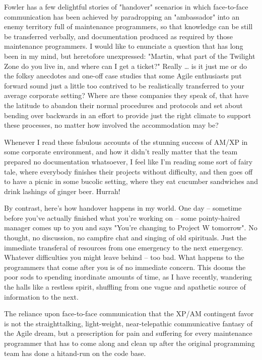 \documentclass{article}
\begin{document}
Fowler has a few delightful stories of "handover" scenarios in which
face-to-face communication has been achieved by paradropping an
"ambassador" into an enemy territory full of maintenance programmers, so
that knowledge can be still be transferred verbally, and documentation
produced as required by those maintenance programmers. I would like to
enunciate a question that has long been in my mind, but heretofore
unexpressed: "Martin, what part of the Twilight Zone do you live in, and
where can I get a ticket?" Really \ldots{} is it just me or do the folksy
anecdotes and one-off case studies that some Agile enthusiasts put
forward sound just a little too contrived to be realistically
transferred to your average corporate setting? Where are these companies
they speak of, that have the latitude to abandon their normal procedures
and protocols and set about bending over backwards in an effort to
provide just the right climate to support these processes, no matter how
involved the accommodation may be?

Whenever I read these fabulous accounts of the stunning success of AM/XP
in some corporate environment, and how it didn't really matter that the
team prepared no documentation whatsoever, I feel like I'm reading some
sort of fairy tale, where everybody finishes their projects without
difficulty, and then goes off to have a picnic in some bucolic setting,
where they eat cucumber sandwiches and drink lashings of ginger beer.
Hurrah!

By contrast, here's how handover happens in my world. One day --
sometime before you've actually finished what you're working on -- some
pointy-haired manager comes up to you and says "You're changing to
Project W tomorrow". No thought, no discussion, no campfire chat and
singing of old spirituals. Just the immediate transferal of resources
from one emergency to the next emergency. Whatever difficulties you
might leave behind -- too bad. What happens to the programmers that come
after you is of no immediate concern. This dooms the poor sods to
spending inordinate amounts of time, as I have recently, wandering the
halls like a restless spirit, shuffling from one vague and apathetic
source of information to the next.

The reliance upon face-to-face communication that the XP/AM contingent
favor is not the straighttalking, light-weight, near-telepathic
communicative fantasy of the Agile dream, but a prescription for pain
and suffering for every maintenance programmer that has to come along
and clean up after the original programming team has done a hitand-run
on the code base.
\end{document}
